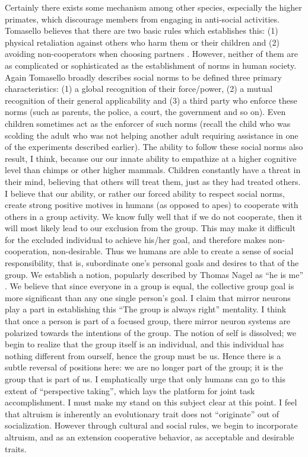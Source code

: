 \documentclass[12pt, letter]{article}
\begin{document}
Certainly there exists some mechanism among other species, especially the higher primates, which discourage members from engaging in anti-social activities. Tomasello believes that there are two basic rules which establishes this: (1) physical retaliation against others who harm them or their children and (2) avoiding non-cooperators when choosing partners \cite{tomasello2008origins}. However, neither of them are as complicated or sophisticated as the establishment of norms in human society. Again Tomasello broadly describes social norms to be defined three primary characteristics: (1) a global recognition of their force/power, (2) a mutual recognition of their general applicability and (3) a third party who enforce these norms (such as parents, the police, a court, the government and so on). Even children sometimes act as the enforcer of such norms (recall the child who was scolding the adult who was not helping another adult requiring assistance in one of the experiments described earlier). The ability to follow these social norms also result, I think, because our our innate ability to empathize at a higher cognitive level than chimps or other higher mammals. Children constantly have a threat in their mind, believing that others will treat them, just as they had treated others. I believe that our ability, or rather our forced ability to respect social norms, create strong positive motives in humans (as opposed to apes) to cooperate with others in a group activity. We know fully well that if we do not cooperate, then it will most likely lead to our exclusion from the group. This may make it difficult for the excluded individual to achieve his/her goal, and therefore makes non-cooperation, non-desirable. Thus we humans are able to create a sense of social responsibility, that is, subordinate one's personal goals and desires to that of the group. We establish a notion, popularly described by Thomas Nagel as ``he is me'' \cite{nagel1979possibility}. We believe that since everyone in a group is equal, the collective group goal is more significant than any one single person's goal. I claim that mirror neurons play a part in establishing this ``The group is always right'' mentality. I think that once a person is part of a focused group, there mirror neuron systems are polarized towards the intentions of the group. The notion of self is dissolved; we begin to realize that the group itself is an individual, and this individual has nothing different from ourself, hence the group must be us. Hence there is a subtle reversal of positions here: we are no longer part of the group; it is the group that is part of us. I emphatically urge that only humans can go to this extent of 	``perspective taking'', which lays the platform for joint task accomplishment. I must make my stand on this subject clear at this point. I feel that altruism is inherently an evolutionary trait does not ``originate'' out of socialization. However through cultural and social rules, we begin to incorporate altruism, and as an extension cooperative behavior, as acceptable and desirable traits.
\end{document}
